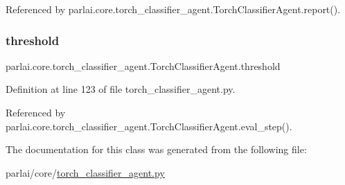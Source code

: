 Referenced by parlai.\+core.\+torch\+\_\+classifier\+\_\+agent.\+Torch\+Classifier\+Agent.\+report().

\mbox{\label{classparlai_1_1core_1_1torch__classifier__agent_1_1TorchClassifierAgent_aba6e1d0ef53762f5930c271c3ae8d63a}} 
\subsubsection{\texorpdfstring{threshold}{threshold}}
{\footnotesize\ttfamily parlai.\+core.\+torch\+\_\+classifier\+\_\+agent.\+Torch\+Classifier\+Agent.\+threshold}



Definition at line 123 of file torch\+\_\+classifier\+\_\+agent.\+py.



Referenced by parlai.\+core.\+torch\+\_\+classifier\+\_\+agent.\+Torch\+Classifier\+Agent.\+eval\+\_\+step().



The documentation for this class was generated from the following file\+:\begin{DoxyCompactItemize}
\item 
parlai/core/\hyperlink{torch__classifier__agent_8py}{torch\+\_\+classifier\+\_\+agent.\+py}\end{DoxyCompactItemize}
